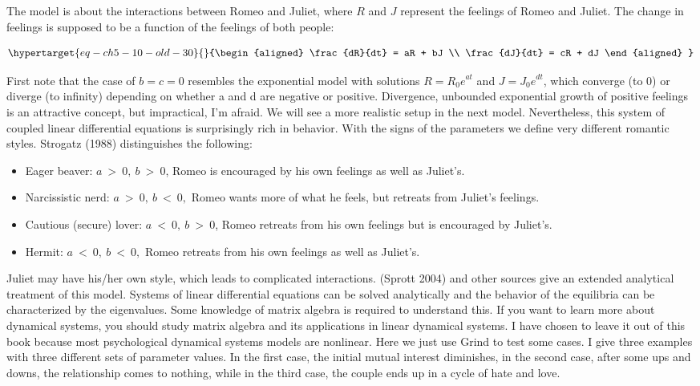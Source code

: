 \documentclass[
  letterpaper,
]{scrbook}
\begin{document}
The model is about the interactions between Romeo and Juliet, where
\(R\) and \(J\) represent the feelings of Romeo and Juliet. The change
in feelings is supposed to be a function of the feelings of both people:

\begin{equation}\protect\hypertarget{eq-ch5-10-old-30}{}{\begin{align*}
\frac{dR}{dt} = aR + bJ \\
\frac{dJ}{dt} = cR + dJ
\end{align*}
}\label{eq-ch5-10-old-30}\end{equation}

First note that the case of \(b = c = 0\) resembles the exponential
model with solutions \(R = {R_{0}e}^{at}\) and \(J = {J_{0}e}^{dt}\),
which converge (to 0) or diverge (to infinity) depending on whether a
and d are negative or positive. Divergence, unbounded exponential growth
of positive feelings is an attractive concept, but impractical, I'm
afraid. We will see a more realistic setup in the next model.
Nevertheless, this system of coupled linear differential equations is
surprisingly rich in behavior. With the signs of the parameters we
define very different romantic styles. Strogatz (1988) distinguishes the
following:

\begin{itemize}
\item
  Eager beaver: \(a\  > \ 0,\ b\  > \ 0\), Romeo is encouraged by his
  own feelings as well as Juliet's.
\item
  Narcissistic nerd: \(a\  > \ 0,\ b\  < \ 0,\) Romeo wants more of what
  he feels, but retreats from Juliet's feelings.
\item
  Cautious (secure) lover: \(a\  < \ 0,\ b\  > \ 0\), Romeo retreats
  from his own feelings but is encouraged by Juliet's.
\item
  Hermit: \(a\  < \ 0,\ b\  < \ 0,\) Romeo retreats from his own
  feelings as well as Juliet's.
\end{itemize}

Juliet may have his/her own style, which leads to complicated
interactions. (Sprott 2004) and other sources give an extended
analytical treatment of this model. Systems of linear differential
equations can be solved analytically and the behavior of the equilibria
can be characterized by the eigenvalues. Some knowledge of matrix
algebra is required to understand this. If you want to learn more about
dynamical systems, you should study matrix algebra and its applications
in linear dynamical systems. I have chosen to leave it out of this book
because most psychological dynamical systems models are nonlinear. Here
we just use Grind to test some cases. I give three examples with three
different sets of parameter values. In the first case, the initial
mutual interest diminishes, in the second case, after some ups and
downs, the relationship comes to nothing, while in the third case, the
couple ends up in a cycle of hate and love.
\end{document}
